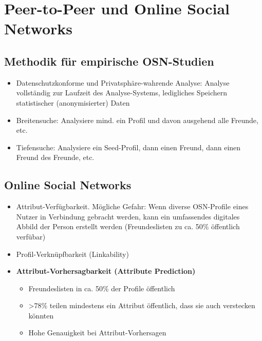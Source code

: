 \section{Peer-to-Peer und Online Social Networks}

\subsection{Methodik für empirische OSN-Studien}
\begin{itemize}
	\item Datenschutzkonforme und Privatsphäre-wahrende Analyse: Analyse vollständig zur Laufzeit des Analyse-Systems, ledigliches Speichern statistischer (anonymisierter) Daten
	\item Breitensuche: Analysiere mind. ein Profil und davon ausgehend alle Freunde, etc.
	\item Tiefensuche: Analysiere ein Seed-Profil, dann einen Freund, dann einen Freund des Freunde, etc.
\end{itemize}


\subsection{Online Social Networks}
\begin{itemize}
	\item Attribut-Verfügbarkeit. Mögliche Gefahr: Wenn diverse OSN-Profile eines Nutzer in Verbindung gebracht werden, kann ein umfassendes digitales Abbild der Person erstellt werden (Freundeslisten zu ca. 50\% öffentlich verfübar)
	\item Profil-Verknüpfbarkeit (Linkability)
	\item \textbf{Attribut-Vorhersagbarkeit (Attribute Prediction)}
	\begin{itemize}
		\item Freundeslisten in ca. 50\% der Profile öffentlich
		\item >78\% teilen mindestens ein Attribut öffentlich, dass sie auch verstecken könnten
		\item Hohe Genauigkeit bei Attribut-Vorhersagen
	\end{itemize}
\end{itemize}


